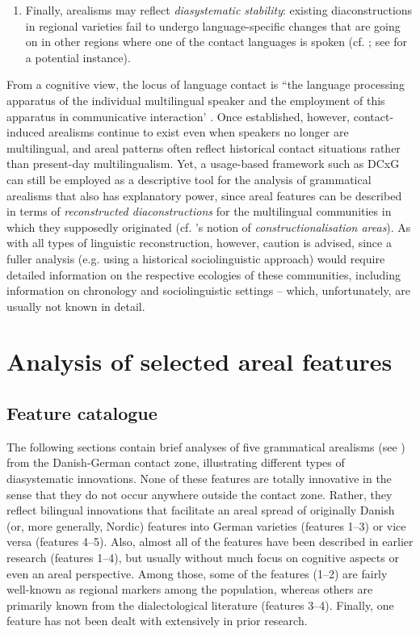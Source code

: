 \documentclass[output=paper]{langsci/langscibook}
\begin{document}
\begin{enumerate}
 \item Finally, arealisms may reflect \textit{diasystematic stability}: existing diaconstructions in regional varieties fail to undergo language-specific changes that are going on in other regions where one of the contact languages is spoken (cf. \citealt{KühlBraunmüller2014}; see  for a potential instance).
 
\end{enumerate}



From a cognitive view, the locus of language contact is “the language processing apparatus of the individual multilingual speaker and the employment of this apparatus in communicative interaction' \citep[3]{Matras.2020}. Once established, however, contact-induced arealisms continue to exist even when speakers no longer are multilingual, and areal patterns often reflect historical contact situations rather than present-day multilingualism. Yet, a usage-based framework such as DCxG can still be employed as a descriptive tool for the analysis of grammatical arealisms that also has explanatory power, since areal features can be described in terms of \textit{reconstructed diaconstructions} for the multilingual communities in which they supposedly originated (cf. \citeauthor{Holzl.2018}’s \citeyear{Holzl.2018} notion of \textit{constructionalisation areas}). As with all types of linguistic reconstruction, however, caution is advised, since a fuller analysis (e.g. using a historical sociolinguistic approach) would require detailed information on the respective ecologies of these communities, including information on chronology and sociolinguistic settings – which, unfortunately, are usually not known in detail.


\section{Analysis of selected areal features}
 \label{sec:hoeder:4}


 \subsection{Feature catalogue}
 \label{sec:hoeder:4.1}

The following sections contain brief analyses of five grammatical arealisms (see ) from the Danish-German contact zone, illustrating different types of diasystematic innovations. None of these features are totally innovative in the sense that they do not occur anywhere outside the contact zone. Rather, they reflect bilingual innovations that facilitate an areal spread of originally Danish (or, more generally, Nordic) features into German varieties (features 1--3) or vice versa (features 4--5). Also, almost all of the features have been described in earlier research (features 1--4), but usually without much focus on cognitive aspects or even an areal perspective. Among those, some of the features (1--2) are fairly well-known as regional markers among the population, whereas others are primarily known from the dialectological literature (features 3--4). Finally, one feature  has not been dealt with extensively in prior research.
\end{document}
